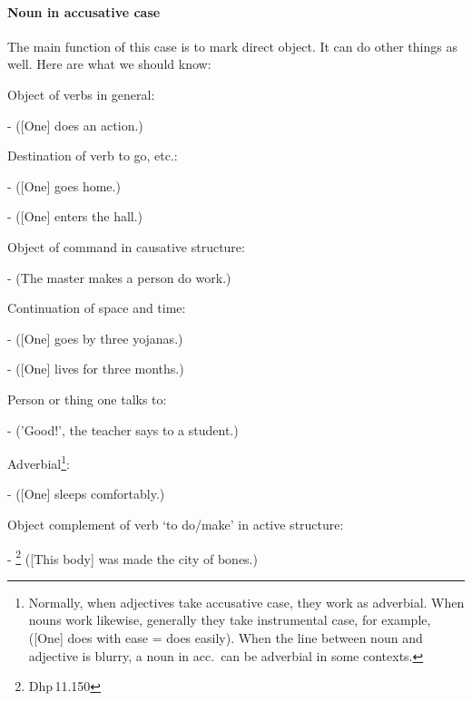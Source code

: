\paragraph*{Noun in accusative case} The main function of this case is to mark direct object. It can do other things as well. Here are what we should know:
\begin{compactenum}[(1)]
\item Object of verbs in general:\par
-  ([One] does an action.)\par
\item Destination of verb to go, etc.:\par
-  ([One] goes home.)\par
-  ([One] enters the hall.)\par
\item Object of command in causative structure:\par
-  (The master makes a person do work.)\par
\item Continuation of space and time:\par
-  ([One] goes by three yojanas.)\par
-  ([One] lives for three months.)\par
\item Person or thing one talks to:\par
-  ('Good!', the teacher says to a student.)\par
\item Adverbial\footnote{Normally, when adjectives take accusative case, they work as adverbial. When nouns work likewise, generally they take instrumental case, for example,  ([One] does with ease = does easily). When the line between noun and adjective is blurry, a noun in acc.\ can be adverbial in some contexts.}:\par
-  ([One] sleeps comfortably.)\par
\item Object complement of verb `to do/make' in active structure:\par
- \footnote{Dhp\,11.150} ([This body] was made the city of bones.)\par

\end{compactenum}
